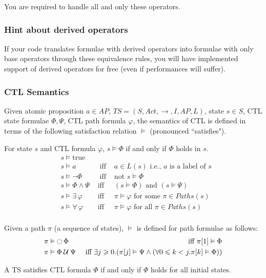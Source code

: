 \documentclass{article}
\begin{document}
You are required to handle all and only these operators.

\subsubsection*{Hint about derived operators}
If your code translates formulae with derived operators into formulae 
with only base operators through these equivalence rules, you will have implemented support of 
derived operators for free (even if performances will suffer).

\subsubsection*{CTL Semantics}
Given atomic proposition $a \in AP$, $TS = (S, Act, \rightarrow, I, AP, L)$, state $s \in S$, 
CTL state formulae $\Phi, \Psi$, CTL path formula $\varphi$, 
the semantics of CTL is defined in terms of the following satisfaction relation $\vDash$ (pronounced ``satisfies").

For state $s$ and CTL formula $\varphi$, $s \vDash \Phi$ if and only if $\Phi$ holds in $s$.
\begin{align*}
     & s \vDash \text{true} & \\
     & s \vDash a &\; \text{ iff } & a \in L(s) \text{ i.e., $a$ is a label of $s$}\\ 
     & s \vDash \neg \Phi &\; \text{ iff } & \text{not } s \vDash \Phi \\
     & s \vDash \Phi \land \Psi & \text{ iff }&  (s \vDash \Phi) \text{ and } (s \vDash \Psi) \\
     & s \vDash \exists \, \varphi & \text{ iff } & \pi \vDash \varphi \text{ for some } \pi \in Paths(s) \\ 
     & s \vDash \forall \, \varphi & \text{ iff } & \pi \vDash \varphi \text{ for all } \pi \in Paths(s) \\ 
\end{align*}

Given a path $\pi$ (a sequence of states), $\vDash$ is defined for path formulae as follows: 
\begin{align*}
    & \pi \vDash \mathop{\ocircle}{\Phi} & \text{ iff } \pi[1]  \vDash \Phi \\ 
    & \pi \vDash \Phi \mathbin{\mathcal{U}} \Psi & \text{ iff } \exists j \geqslant 0. (\pi[j]  \vDash \Psi \land (\forall 0 \leqslant k < j. \pi[k]  \vDash \Phi))
\end{align*}

A TS satisfies CTL formula $\Phi$ if and only if $\Phi$ holds for all initial states.
\end{document}
